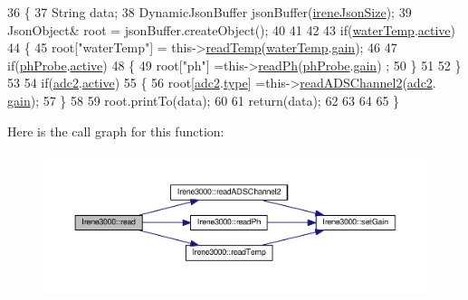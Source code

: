 \begin{DoxyCode}
36 \{   
37     String data;
38     DynamicJsonBuffer jsonBuffer(\hyperlink{classIrene3000_a6534710e4c81669dcc828d2c5450fabe}{ireneJsonSize});
39     JsonObject& root = jsonBuffer.createObject();
40 
41 
42         
43     \textcolor{keywordflow}{if}(\hyperlink{classIrene3000_af05612c78c758ce9db316c75ad937130}{waterTemp}.\hyperlink{structIrene3000_1_1state_af7ff649f20b9a2fb6ca0f949ee9a25ce}{active})
44     \{
45         root[\textcolor{stringliteral}{"waterTemp"}] = this->\hyperlink{classIrene3000_a94ad40f281d83ad1be20bf1edd6fe802}{readTemp}(\hyperlink{classIrene3000_af05612c78c758ce9db316c75ad937130}{waterTemp}.\hyperlink{structIrene3000_1_1state_a1ecf69d38cb31ecaf6b3602a3f3e93cb}{gain});
46 
47         \textcolor{keywordflow}{if}(\hyperlink{classIrene3000_a997a4ee466fa1d5416e07e444965dc9e}{phProbe}.\hyperlink{structIrene3000_1_1state_af7ff649f20b9a2fb6ca0f949ee9a25ce}{active})
48         \{
49             root[\textcolor{stringliteral}{"ph"}] =this->\hyperlink{classIrene3000_abf3db725fabb0634ec889b32068a5eec}{readPh}(\hyperlink{classIrene3000_a997a4ee466fa1d5416e07e444965dc9e}{phProbe}.\hyperlink{structIrene3000_1_1state_a1ecf69d38cb31ecaf6b3602a3f3e93cb}{gain}) ;
50         \}
51 
52     \}
53 
54     \textcolor{keywordflow}{if}(\hyperlink{classIrene3000_aae3a95a1c83c766cd2f299ce471c337e}{adc2}.\hyperlink{structIrene3000_1_1state_af7ff649f20b9a2fb6ca0f949ee9a25ce}{active})
55     \{
56         root[\hyperlink{classIrene3000_aae3a95a1c83c766cd2f299ce471c337e}{adc2}.\hyperlink{structIrene3000_1_1state_a9897a7e02727db6351d44006eec73799}{type}] =this->\hyperlink{classIrene3000_ae73bd2ed14a199a7e83f4d6458476a7c}{readADSChannel2}(\hyperlink{classIrene3000_aae3a95a1c83c766cd2f299ce471c337e}{adc2}.
      \hyperlink{structIrene3000_1_1state_a1ecf69d38cb31ecaf6b3602a3f3e93cb}{gain});
57     \}
58     
59     root.printTo(data);
60     
61     \textcolor{keywordflow}{return}(data);
62     
63     
64 
65 \}
\end{DoxyCode}
Here is the call graph for this function\+:\nopagebreak
\begin{figure}[H]
\begin{center}
\leavevmode
\includegraphics[width=350pt]{classIrene3000_a852a170feea994ea1df01c6b245b5d9a_cgraph}
\end{center}
\end{figure}
